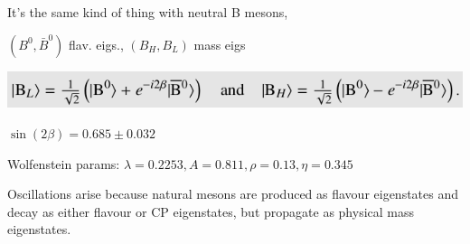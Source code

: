It's the same kind of thing with neutral B mesons,

$(B^0, \bar{B}^0)$ flav. eigs., $(B_H, B_L)$ mass eigs
\begin{center}
    \includegraphics[width=\linewidth]{images/BH_BL.png}
\end{center}

$\sin(2\beta) = 0.685 \pm 0.032$

Wolfenstein params: $\lambda = 0.2253, A = 0.811, \rho = 0.13, \eta = 0.345$

Oscillations arise because natural mesons are produced as flavour eigenstates and decay as either flavour or CP eigenstates, but propagate as physical mass eigenstates.